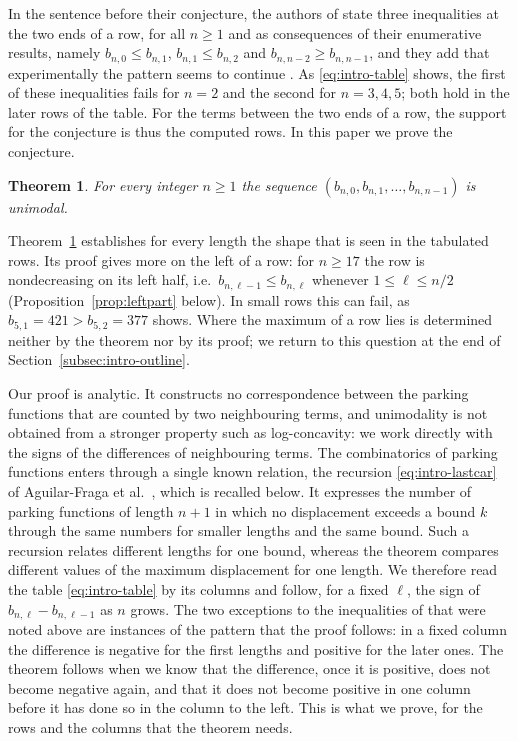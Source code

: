\documentclass{amsart}
\newtheorem{theorem}{Theorem}[section]
\theoremstyle{definition}
\theoremstyle{remark}
\numberwithin{equation}{section}
\begin{document}
In the sentence before their conjecture, the authors of \cite{celano2025} state three inequalities at the two ends of a row, for all $n\ge 1$ and as consequences of their enumerative results, namely $b_{n,0}\le b_{n,1}$, $b_{n,1}\le b_{n,2}$ and $b_{n,n-2}\ge b_{n,n-1}$, and they add that experimentally the pattern seems to continue \cite[Section~6]{celano2025}. As \eqref{eq:intro-table} shows, the first of these inequalities fails for $n=2$ and the second for $n=3,4,5$; both hold in the later rows of the table. For the terms between the two ends of a row, the support for the conjecture is thus the computed rows. In this paper we prove the conjecture.

\begin{theorem}\label{thm:main}
For every integer $n\ge 1$ the sequence $(b_{n,0},b_{n,1},\dots,b_{n,n-1})$ is unimodal.
\end{theorem}

Theorem~\ref{thm:main} establishes for every length the shape that is seen in the tabulated rows. Its proof gives more on the left of a row: for $n\ge 17$ the row is nondecreasing on its left half, i.e.\ $b_{n,\ell-1}\le b_{n,\ell}$ whenever $1\le\ell\le n/2$ (Proposition~\ref{prop:leftpart} below). In small rows this can fail, as $b_{5,1}=421>b_{5,2}=377$ shows. Where the maximum of a row lies is determined neither by the theorem nor by its proof; we return to this question at the end of Section~\ref{subsec:intro-outline}.

Our proof is analytic. It constructs no correspondence between the parking functions that are counted by two neighbouring terms, and unimodality is not obtained from a stronger property such as log-concavity: we work directly with the signs of the differences of neighbouring terms. The combinatorics of parking functions enters through a single known relation, the recursion \eqref{eq:intro-lastcar} of Aguilar-Fraga et al.\ \cite[Theorem~3.7]{aguilarfraga2024}, which is recalled below. It expresses the number of parking functions of length $n+1$ in which no displacement exceeds a bound $k$ through the same numbers for smaller lengths and the same bound. Such a recursion relates different lengths for one bound, whereas the theorem compares different values of the maximum displacement for one length. We therefore read the table \eqref{eq:intro-table} by its columns and follow, for a fixed $\ell$, the sign of $b_{n,\ell}-b_{n,\ell-1}$ as $n$ grows. The two exceptions to the inequalities of \cite{celano2025} that were noted above are instances of the pattern that the proof follows: in a fixed column the difference is negative for the first lengths and positive for the later ones. The theorem follows when we know that the difference, once it is positive, does not become negative again, and that it does not become positive in one column before it has done so in the column to the left. This is what we prove, for the rows and the columns that the theorem needs.
\end{document}
